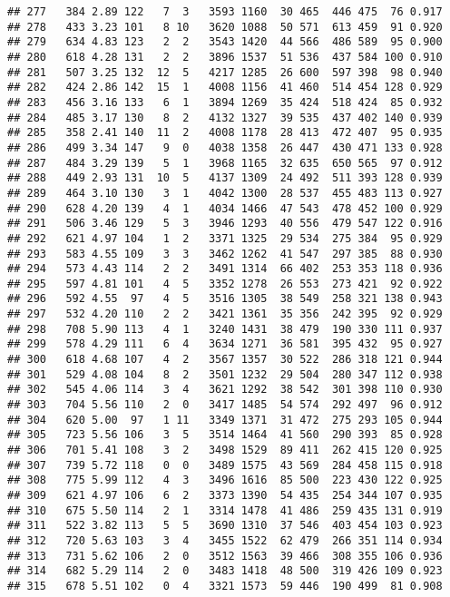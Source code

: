 \documentclass[]{article}
\begin{document}
\begin{verbatim}
## 277   384 2.89 122   7  3   3593 1160  30 465  446 475  76 0.917
## 278   433 3.23 101   8 10   3620 1088  50 571  613 459  91 0.920
## 279   634 4.83 123   2  2   3543 1420  44 566  486 589  95 0.900
## 280   618 4.28 131   2  2   3896 1537  51 536  437 584 100 0.910
## 281   507 3.25 132  12  5   4217 1285  26 600  597 398  98 0.940
## 282   424 2.86 142  15  1   4008 1156  41 460  514 454 128 0.929
## 283   456 3.16 133   6  1   3894 1269  35 424  518 424  85 0.932
## 284   485 3.17 130   8  2   4132 1327  39 535  437 402 140 0.939
## 285   358 2.41 140  11  2   4008 1178  28 413  472 407  95 0.935
## 286   499 3.34 147   9  0   4038 1358  26 447  430 471 133 0.928
## 287   484 3.29 139   5  1   3968 1165  32 635  650 565  97 0.912
## 288   449 2.93 131  10  5   4137 1309  24 492  511 393 128 0.939
## 289   464 3.10 130   3  1   4042 1300  28 537  455 483 113 0.927
## 290   628 4.20 139   4  1   4034 1466  47 543  478 452 100 0.929
## 291   506 3.46 129   5  3   3946 1293  40 556  479 547 122 0.916
## 292   621 4.97 104   1  2   3371 1325  29 534  275 384  95 0.929
## 293   583 4.55 109   3  3   3462 1262  41 547  297 385  88 0.930
## 294   573 4.43 114   2  2   3491 1314  66 402  253 353 118 0.936
## 295   597 4.81 101   4  5   3352 1278  26 553  273 421  92 0.922
## 296   592 4.55  97   4  5   3516 1305  38 549  258 321 138 0.943
## 297   532 4.20 110   2  2   3421 1361  35 356  242 395  92 0.929
## 298   708 5.90 113   4  1   3240 1431  38 479  190 330 111 0.937
## 299   578 4.29 111   6  4   3634 1271  36 581  395 432  95 0.927
## 300   618 4.68 107   4  2   3567 1357  30 522  286 318 121 0.944
## 301   529 4.08 104   8  2   3501 1232  29 504  280 347 112 0.938
## 302   545 4.06 114   3  4   3621 1292  38 542  301 398 110 0.930
## 303   704 5.56 110   2  0   3417 1485  54 574  292 497  96 0.912
## 304   620 5.00  97   1 11   3349 1371  31 472  275 293 105 0.944
## 305   723 5.56 106   3  5   3514 1464  41 560  290 393  85 0.928
## 306   701 5.41 108   3  2   3498 1529  89 411  262 415 120 0.925
## 307   739 5.72 118   0  0   3489 1575  43 569  284 458 115 0.918
## 308   775 5.99 112   4  3   3496 1616  85 500  223 430 122 0.925
## 309   621 4.97 106   6  2   3373 1390  54 435  254 344 107 0.935
## 310   675 5.50 114   2  1   3314 1478  41 486  259 435 131 0.919
## 311   522 3.82 113   5  5   3690 1310  37 546  403 454 103 0.923
## 312   720 5.63 103   3  4   3455 1522  62 479  266 351 114 0.934
## 313   731 5.62 106   2  0   3512 1563  39 466  308 355 106 0.936
## 314   682 5.29 114   2  0   3483 1418  48 500  319 426 109 0.923
## 315   678 5.51 102   0  4   3321 1573  59 446  190 499  81 0.908

\end{verbatim}
\end{document}
